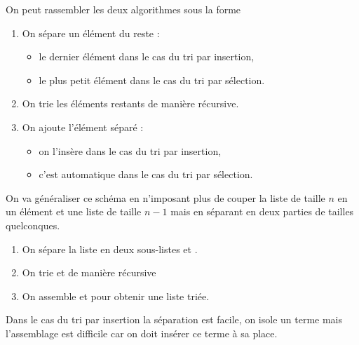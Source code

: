 On peut rassembler les deux algorithmes sous la forme 
\begin{enumerate}
\item On sépare un élément du reste :
\begin{itemize}
\item le dernier élément dans le cas du tri par insertion,
\item le plus petit élément dans le cas du tri par sélection.
\end{itemize} 
\item On trie les éléments restants de manière récursive.
\item On ajoute l'élément séparé : 
\begin{itemize}
\item on l'insère dans le cas du tri par insertion,
\item c'est automatique dans le cas du tri par sélection.
\end{itemize}
\end{enumerate}
On va généraliser ce schéma en n'imposant plus de couper la liste de taille $n$ en un élément et une liste de taille $n - 1$ mais en séparant en deux parties de tailles quelconques.
\begin{enumerate}
\item On sépare la liste en deux sous-listes  et .
\item On trie  et  de manière récursive
\item On assemble  et  pour obtenir une liste triée.
\end{enumerate}
\begin{center}
\end{center}
Dans le cas du tri par insertion la séparation est facile, on isole un terme mais l'assemblage est difficile car on doit insérer ce terme à sa place.

